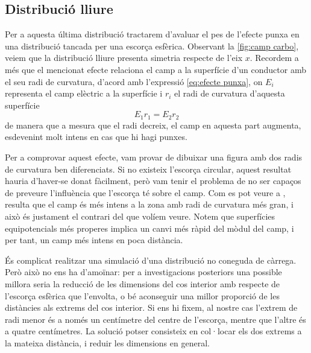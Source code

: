 \subsection{Distribució lliure}
Per a aquesta última distribució tractarem d'avaluar el pes de l'efecte punxa en una distribució tancada per una escorça esfèrica. Observant la \cref{fig:camp carbo}, veiem que la distribució lliure presenta simetria respecte de l'eix $x$. Recordem a més que el mencionat efecte relaciona el camp a la superfície d'un conductor amb el seu radi de curvatura, d'acord amb l'expressió \cref{eq:efecte punxa}, on $E_i$ representa el camp elèctric a la superfície i $r_i$ el radi de curvatura d'aquesta superfície
\begin{equation} \label{eq:efecte punxa}
	E_1r_1=E_2r_2
\end{equation}
de manera que a mesura que el radi decreix, el camp en aquesta part augmenta, esdevenint molt intens en cas que hi hagi punxes.

Per a comprovar aquest efecte, vam provar de dibuixar una figura amb dos radis de curvatura ben diferenciats. Si no existeix l'escorça circular, aquest resultat hauria d'haver-se donat fàcilment, però vam tenir el problema de no ser capaços de preveure l'influència que l'escorça té sobre el camp. Com es pot veure a , resulta que el camp és més intens a la zona amb radi de curvatura més gran, i això és justament el contrari del que volíem veure. Notem que superfícies equipotencials més properes implica un canvi més ràpid del mòdul del camp, i per tant, un camp més intens en poca distància.

És complicat realitzar una simulació d'una distribució no coneguda de càrrega. Però això no ens ha d'amoïnar: per a investigacions posteriors una possible millora seria la reducció de les dimensions del cos interior amb respecte de l'escorça esfèrica que l'envolta, o bé aconseguir una millor proporció de les distàncies als extrems del cos interior. Si ens hi fixem, al nostre cas l'extrem de radi menor és a només un centímetre del centre de l'escorça, mentre que l'altre és a quatre centímetres. La solució potser consisteix en col·locar els dos extrems a la mateixa distància, i reduir les dimensions en general.
